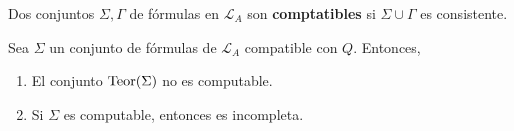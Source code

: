 \documentclass[12pt]{report}
\newcounter{it}
\theoremstyle{largebreak}
\begin{document}
    \begin{mydef}
        Dos conjuntos $\Sigma,\Gamma$ de fórmulas en $\mathcal{L}_A$ son \textbf{comptatibles} si $\Sigma\cup\Gamma$ es consistente.
    \end{mydef}

    \begin{theor}
        Sea $\Sigma$ un conjunto de fórmulas de $\mathcal{L}_A$ compatible con $Q$. Entonces,
        \begin{enumerate}[label = \textit{(\arabic*)}]
            \item El conjunto $\textup{Teor}(\Sigma)$ no es computable.
            \item Si $\Sigma$ es computable, entonces es incompleta.
        \end{enumerate}
    \end{theor}
\end{document}
